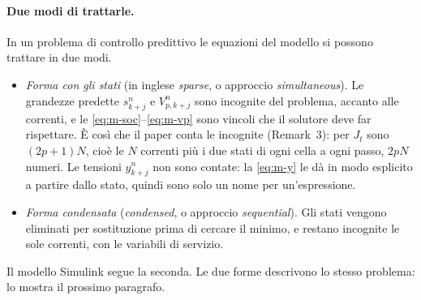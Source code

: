 \documentclass[11pt,a4paper]{article}
\begin{document}
\paragraph{Due modi di trattarle.} In un problema di controllo predittivo le
equazioni del modello si possono trattare in due modi.
\begin{itemize}
  \item \emph{Forma con gli stati} (in inglese \emph{sparse}, o approccio
        \emph{simultaneous}). Le grandezze predette $s^n_{k+j}$ e
        $V^n_{p,k+j}$ sono incognite del problema, accanto alle correnti, e le
        \eqref{eq:m-soc}--\eqref{eq:m-vp} sono vincoli che il solutore deve
        far rispettare. È così che il paper conta le incognite (Remark~3): per
        $J_t$ sono $(2p+1)N$, cioè le $N$ correnti più i due stati di ogni
        cella a ogni passo, $2pN$ numeri. Le tensioni $y^n_{k+j}$ non sono
        contate: la \eqref{eq:m-y} le dà in modo esplicito a partire dallo
        stato, quindi sono solo un nome per un'espressione.
  \item \emph{Forma condensata} (\emph{condensed}, o approccio
        \emph{sequential}). Gli stati vengono eliminati per sostituzione prima
        di cercare il minimo, e restano incognite le sole correnti, con le
        variabili di servizio.
\end{itemize}
Il modello Simulink segue la seconda. Le due forme descrivono lo stesso
problema: lo mostra il prossimo paragrafo.
\end{document}
